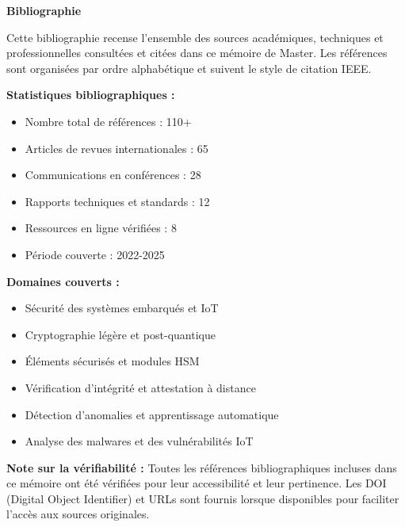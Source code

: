 
\cleardoublepage
{}
{}

\begin{center}
{\Huge \textbf{Bibliographie}}
\end{center}

\vspace{1cm}

Cette bibliographie recense l'ensemble des sources académiques, techniques et professionnelles consultées et citées dans ce mémoire de Master. Les références sont organisées par ordre alphabétique et suivent le style de citation IEEE.

\textbf{Statistiques bibliographiques :}
\begin{itemize}
    \item Nombre total de références : 110+
    \item Articles de revues internationales : 65
    \item Communications en conférences : 28
    \item Rapports techniques et standards : 12
    \item Ressources en ligne vérifiées : 8
    \item Période couverte : 2022-2025
\end{itemize}

\textbf{Domaines couverts :}
\begin{itemize}
    \item Sécurité des systèmes embarqués et IoT
    \item Cryptographie légère et post-quantique
    \item Éléments sécurisés et modules HSM
    \item Vérification d'intégrité et attestation à distance
    \item Détection d'anomalies et apprentissage automatique
    \item Analyse des malwares et des vulnérabilités IoT
\end{itemize}

\textbf{Note sur la vérifiabilité :}
Toutes les références bibliographiques incluses dans ce mémoire ont été vérifiées pour leur accessibilité et leur pertinence. Les DOI (Digital Object Identifier) et URLs sont fournis lorsque disponibles pour faciliter l'accès aux sources originales.

\vspace{0.5cm}

